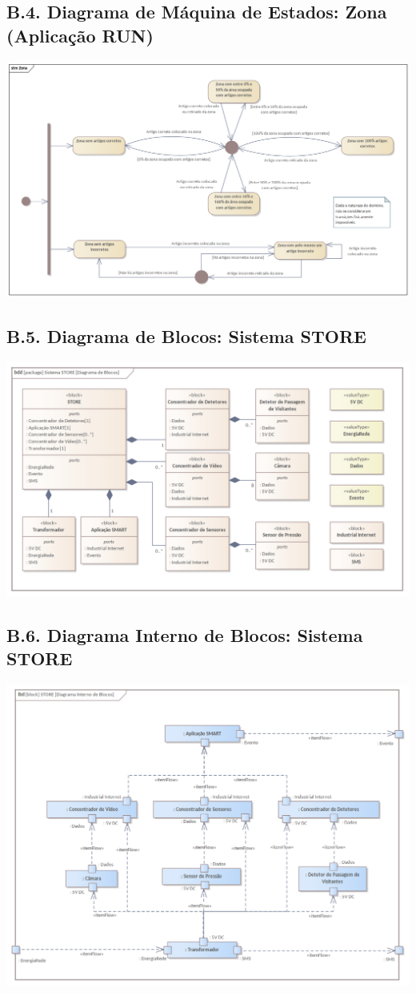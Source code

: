 \documentclass[12pt,a4paper]{article}
\begin{document}
\begin{landscape}
	\section*{B.4. Diagrama de Máquina de Estados: Zona (Aplicação RUN)}
	\includegraphics[width=1.59\textwidth]{../State_Zona.png}
\end{landscape}

\begin{landscape}
	\section*{B.5. Diagrama de Blocos: Sistema STORE}
	\includegraphics[width=1.59\textwidth]{../BDD_STORE.png}
\end{landscape}

\begin{landscape}
	\section*{B.6. Diagrama Interno de Blocos: Sistema STORE}
	\includegraphics[width=1.25\textwidth]{../iBD_STORE.png}
\end{landscape}
\end{document}

